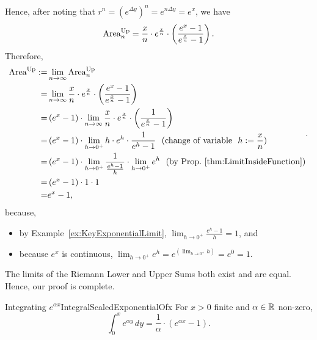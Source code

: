 Hence, after noting that $r^{n} = \left( e^{\Delta y} \right)^n = e^{n \Delta y} = e^x$, we have
\begin{equation}
    {\rm Area}^{\rm Up}_n  =   \frac{x}{n}\cdot e^{ \frac{x}{n}} \cdot \left( \frac{e^x -1}{e^{ \frac{x}{n} }-1}  \right).
\end{equation}
Therefore,
\begin{equation}
\begin{aligned}
  {\rm Area}^{\rm Up} :=& \lim_{n \to \infty} {\rm Area}^{\rm Up}_n  \\
  =&  \lim_{n \to \infty} \frac{x}{n}\cdot e^{ \frac{x}{n}} \cdot \left( \frac{e^x -1}{e^{ \frac{x}{n} }-1}  \right)\\
    =& \left( e^x -1 \right) \cdot \lim_{n \to \infty} \frac{x}{n}\cdot e^{ \frac{x}{n}} \cdot \left( \frac{1}{e^{ \frac{x}{n} }-1}  \right)\\
  =& \left( e^x -1 \right) \cdot \lim_{h \to 0^+} h \cdot e^h \cdot \frac{1}{e^{ h} -1}  ~~(\text{change of variable}~~ h:= \frac{x}{n})\\
  =&\left( e^x -1 \right) \cdot  \lim_{h \to 0^+}  \frac{1}{ \frac{e^{ h} -1}{h}} \cdot \lim_{h \to 0^+} e^h ~~(\text{by Prop.~\ref{thm:LimitInsideFunction}}) \\
  =& \left( e^x-1 \right) \cdot 1 \cdot 1 \\
  =& e^x-1,
\end{aligned}  .
\end{equation}
because, 
\begin{itemize}
    \item by Example~\ref{ex:KeyExponentialLimit}, $ \displaystyle \lim_{h \to 0^+}  \frac{e^{ h} -1}{h} =1$, and
    \item because $e^x$ is continuous, $\displaystyle \lim_{h \to 0^+} e^h = e^{\left( \displaystyle \lim_{h \to 0^+} h \right)} = e^0 = 1$.
\end{itemize}

The limits of the Riemann Lower and Upper Sums both exist and are equal. Hence, our proof is complete.
\Qed

\bigskip


 \begin{propColor}{Integrating $e^{\alpha x}$}{IntegralScaledExponentialOfx}
For $x>0$ finite and $\alpha \in \mathbb R$ non-zero,
 \begin{equation}
 \label{eq:IntegralExpAlpahx}
     \int_0^x e^{\alpha y}\, dy = \frac{1}{\alpha} \cdot \left(e^{\alpha x} -1 \right).
 \end{equation}
\end{propColor}

